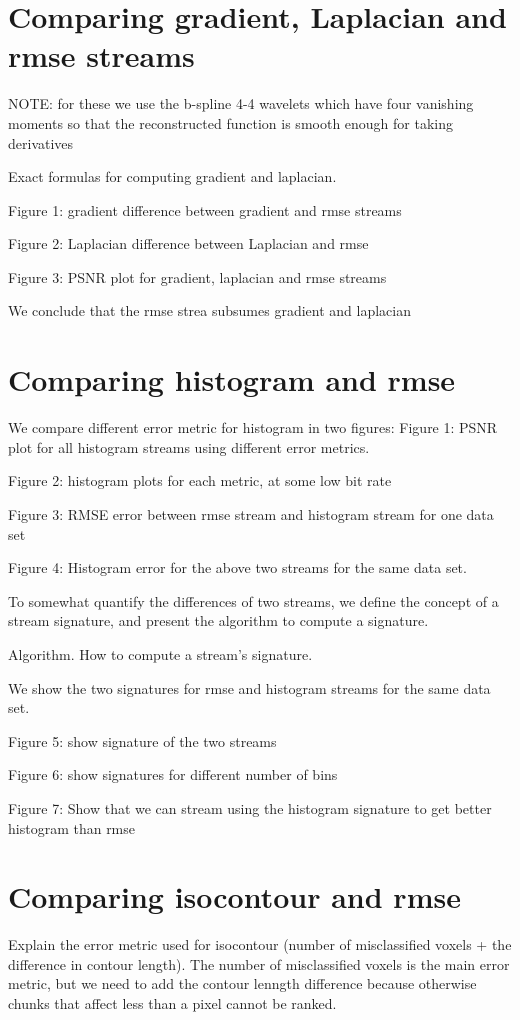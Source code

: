 \section{Comparing gradient, Laplacian and rmse streams}
NOTE: for these we use the b-spline 4-4 wavelets which have four vanishing moments so that the reconstructed function is smooth enough for taking derivatives

Exact formulas for computing gradient and laplacian.

Figure 1: gradient difference between gradient and rmse streams

Figure 2: Laplacian difference between Laplacian and rmse

Figure 3: PSNR plot for gradient, laplacian and rmse streams

We conclude that the rmse strea subsumes gradient and laplacian

\section{Comparing histogram and rmse}
We compare different error metric for histogram in two figures:
Figure 1: PSNR plot for all histogram streams using different error metrics.

Figure 2: histogram plots for each metric, at some low bit rate

Figure 3: RMSE error between rmse stream and histogram stream for one data set

Figure 4: Histogram error for the  above two streams for the same data set.

To somewhat quantify the differences of two streams, we define the concept of a stream signature, and present the algorithm to compute a signature.

Algorithm. How to compute a stream's signature.

We show the two signatures for rmse and histogram streams for the same data set.

Figure 5: show signature of the two streams

Figure 6: show signatures for different number of bins

Figure 7: Show that we can stream using the histogram signature to get better histogram than rmse

\section{Comparing isocontour and rmse}
Explain the error metric used for isocontour (number of misclassified voxels + the difference in contour length). The number of misclassified voxels is the main error metric, but we need to add the contour lenngth difference because otherwise chunks that affect less than a pixel cannot be ranked.

